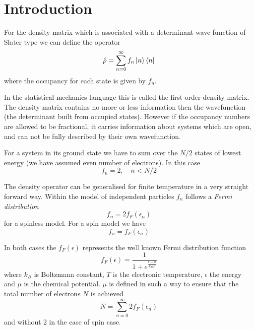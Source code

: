 \section{Introduction}
\par{For the density matrix which is associated with a determinant wave function of Slater type 
we can define the operator}
\begin{equation}
{\hat\rho}=\sum_{n=0}^{\infty}f_n\mathinner{|{n}\rangle}\mathinner{\langle{n}|}
\end{equation}
where the occupancy for each state is given by $f_n$.
\par{In the statistical mechanics language this is called the first order
density matrix. The density matrix contains no more or less information
then the wavefunction (the determinant built from occupied states).
However if the occupancy numbers are allowed to be fractional, it carries information
about systems which are open, and can not be fully described by their own wavefunction.}
\par{For a system in its ground state we have to sum over the $N/2$ states of lowest energy
(we have assumed even number of electrons). In this case }
\begin{equation}
f_n=2, \quad n<N/2
\end{equation}
\par{The density operator can be generalised for finite temperature in a very straight forward way. Within the 
model of independent particles $f_n$ follows a \emph {Fermi distribution}}
\begin{equation}
f_{n}=2f_F(\epsilon_n)
\end{equation}
for a spinless model. For a spin model we have
\begin{equation}
f_{n}=f_F(\epsilon_n)
\end{equation}
\par{In both cases the $f_F(\epsilon)$ represents the well known Fermi distribution function}
\begin{equation}
\label{fermidistribution}
f_F(\epsilon)=\frac{1}{1+e^{\frac{\epsilon-\mu}{k_BT}}}
\end{equation}
where $k_B$ is Boltzmann constant, $T$ is the electronic temperature, $\epsilon$ the energy
and $\mu$ is the chemical potential. $\mu$ is defined in such a way to ensure that 
the total number of electrons $N$ is achieved
\begin{equation}
N=\sum_{n=0}^{\infty}2f_F(\epsilon_n)
\end{equation}
and without $2$ in the case of spin case.
